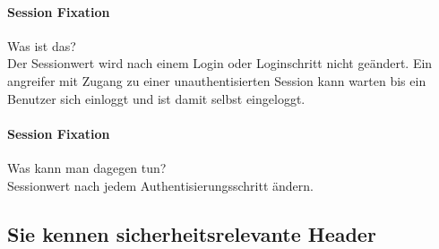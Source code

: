 \documentclass[10pt,a4paper]{article}
\begin{document}
\paragraph*{Session Fixation}Was ist das?\\
Der Sessionwert wird nach einem Login oder Loginschritt nicht geändert. Ein  angreifer mit Zugang zu einer unauthentisierten Session kann warten bis ein Benutzer sich einloggt und ist damit selbst eingeloggt.

\paragraph*{Session Fixation}Was kann man dagegen tun?\\
Sessionwert nach jedem Authentisierungsschritt ändern.

\subsection*{Sie kennen sicherheitsrelevante Header}
\end{document}
